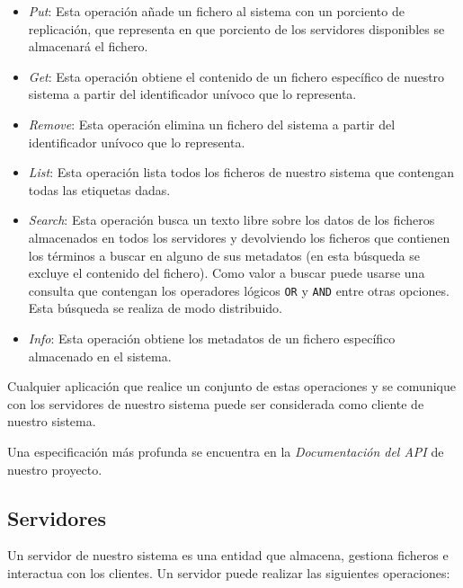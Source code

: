 \documentclass{article}
\begin{document}
\begin{itemize}
  \item \emph{Put}: Esta operación añade un fichero al sistema con
  un porciento de replicación, que representa en que porciento de los
  servidores disponibles se almacenará el fichero.
  \item \emph{Get}: Esta operación obtiene el contenido de un fichero específico
  de nuestro sistema a partir del identificador unívoco que lo representa.
  \item \emph{Remove}: Esta operación elimina un fichero del sistema a partir
  del identificador unívoco que lo representa.
  \item \emph{List}: Esta operación lista todos los ficheros de nuestro sistema
  que contengan todas las etiquetas dadas.
  \item \emph{Search}: Esta operación busca un texto libre sobre los datos
  de los ficheros almacenados en todos los servidores y devolviendo los
  ficheros que contienen los términos a buscar en alguno de sus metadatos (en
  esta búsqueda se excluye el contenido del fichero). Como valor a buscar puede
  usarse una consulta que contengan los operadores lógicos \verb|OR| y
  \verb|AND| entre otras opciones. Esta búsqueda se realiza de modo
  distribuido.
  \item \emph{Info}: Esta operación obtiene los metadatos de un fichero
  específico almacenado en el sistema.
\end{itemize}

Cualquier aplicación que realice un conjunto de estas operaciones y se
comunique con los servidores de nuestro sistema puede ser considerada como
cliente de nuestro sistema.

Una especificación más profunda se encuentra en la \emph{Documentación del API}
de nuestro proyecto.

\subsection{Servidores}

Un servidor de nuestro sistema es una entidad que almacena, gestiona ficheros
e interactua con los clientes. Un servidor puede realizar las siguientes
operaciones:
\end{document}
